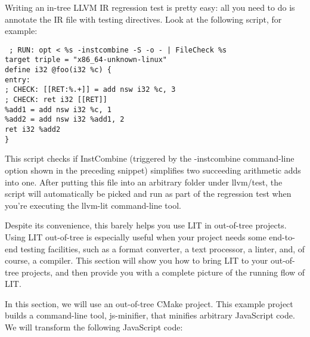 Writing an in-tree LLVM IR regression test is pretty easy: all you need to do is annotate the IR file with testing directives. Look at the following script, for example:

\begin{tcolorbox}[colback=white,colframe=black]
\tt
{}
; RUN: opt < \%s -instcombine -S -o - | FileCheck \%s \\
target triple = "x86\_64-unknown-linux" \\
define i32 @foo(i32 \%c) \{ \\
\hspace*{0.3cm}entry: \\
\hspace*{0.3cm}; CHECK: [[RET:\%.+]] = add nsw i32 \%c, 3 \\
\hspace*{0.3cm}; CHECK: ret i32 [[RET]] \\
\hspace*{0.3cm}\%add1 = add nsw i32 \%c, 1 \\
\hspace*{0.3cm}\%add2 = add nsw i32 \%add1, 2 \\
\hspace*{0.3cm}ret i32 \%add2 \\
\}
\end{tcolorbox}

This script checks if InstCombine (triggered by the -instcombine command-line option shown in the preceding snippet) simplifies two succeeding arithmetic adds into one. After putting this file into an arbitrary folder under llvm/test, the script will automatically be picked and run as part of the regression test when you're executing the llvm-lit command-line tool.

Despite its convenience, this barely helps you use LIT in out-of-tree projects. Using LIT out-of-tree is especially useful when your project needs some end-to-end testing facilities, such as a format converter, a text processor, a linter, and, of course, a compiler. This section will show you how to bring LIT to your out-of-tree projects, and then provide you with a complete picture of the running flow of LIT.


In this section, we will use an out-of-tree CMake project. This example project builds a command-line tool, js-minifier, that minifies arbitrary JavaScript code. We will transform the following JavaScript code:


